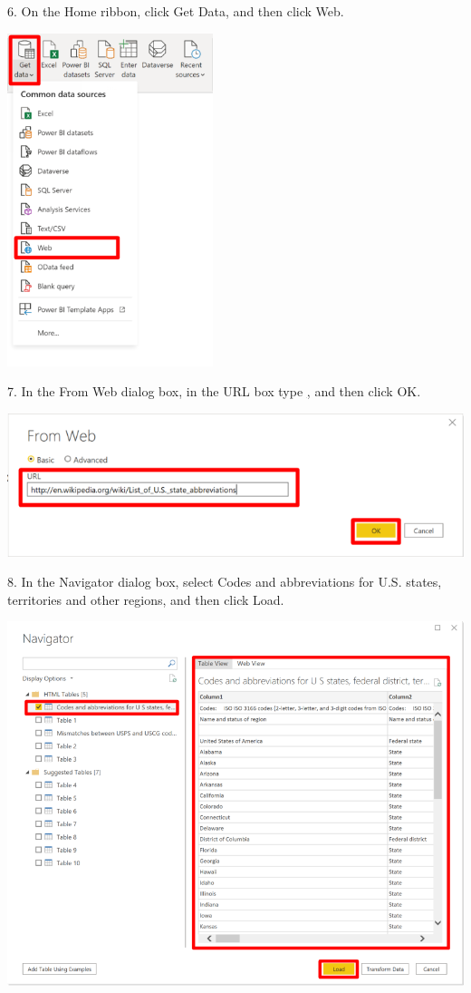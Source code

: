 \documentclass[12pt,letterpaper]{article}
\begin{document}
6. On the Home ribbon, click Get Data, and then click Web.
\begin{center}
    \includegraphics[width=6cm]{img/44.png}  
\end{center}
7. In the From Web dialog box, in the URL box type
\href{http://en.wikipedia.org/wiki/List_of_U.S._state_abbreviations}, and then click OK.
\begin{center}
    \includegraphics[width=17cm]{img/45.png}  
\end{center}
8. In the Navigator dialog box, select Codes and abbreviations for U.S. states, territories and other
regions, and then click Load.
\begin{center}
    \includegraphics[width=15cm]{img/46.png}  
\end{center}
\end{document}
